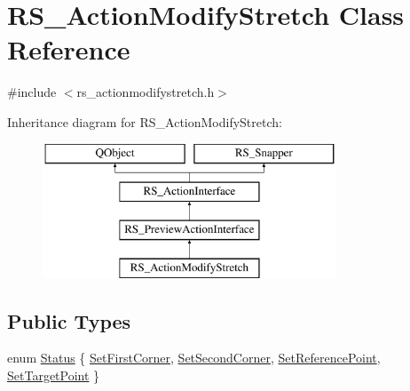 \hypertarget{classRS__ActionModifyStretch}{\section{R\-S\-\_\-\-Action\-Modify\-Stretch Class Reference}
\label{classRS__ActionModifyStretch}
}


{\ttfamily \#include $<$rs\-\_\-actionmodifystretch.\-h$>$}

Inheritance diagram for R\-S\-\_\-\-Action\-Modify\-Stretch\-:\begin{figure}[H]
\begin{center}
\leavevmode
\includegraphics[height=4.000000cm]{classRS__ActionModifyStretch}
\end{center}
\end{figure}
\subsection*{Public Types}
\begin{DoxyCompactItemize}
\item 
enum \hyperlink{classRS__ActionModifyStretch_a76e24e563deadcc168b1af226cff7666}{Status} \{ \hyperlink{classRS__ActionModifyStretch_a76e24e563deadcc168b1af226cff7666a046d6b4a871571e2e2eca1d1cf167d6c}{Set\-First\-Corner}, 
\hyperlink{classRS__ActionModifyStretch_a76e24e563deadcc168b1af226cff7666a4eae9bf6cfaef3c66782d4b4b5b73aef}{Set\-Second\-Corner}, 
\hyperlink{classRS__ActionModifyStretch_a76e24e563deadcc168b1af226cff7666a2b5899630c854b8128faea8f5b4362a0}{Set\-Reference\-Point}, 
\hyperlink{classRS__ActionModifyStretch_a76e24e563deadcc168b1af226cff7666ae7f5f7d7b19c0c48978a9c9e41294702}{Set\-Target\-Point}
 \}
\end{DoxyCompactItemize}
